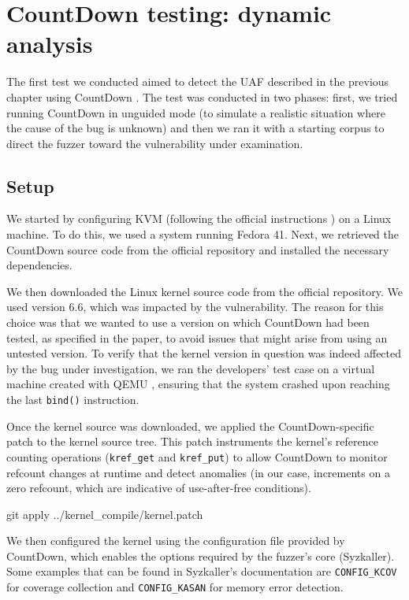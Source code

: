 \chapter{CountDown testing: dynamic analysis}

The first test we conducted aimed to detect the UAF described in the previous chapter using CountDown \cite{bib:countdown}. The test was conducted in two phases: first, we tried running CountDown in unguided mode (to simulate a realistic situation where the cause of the bug is unknown) and then we ran it with a starting corpus to direct the fuzzer toward the vulnerability under examination.

\section{Setup}
We started by configuring KVM (following the official instructions \cite{bib:kvm-install}) on a Linux machine. To do this, we used a system running Fedora 41. Next, we retrieved the CountDown source code from the official repository \cite{bib:countdown-repo} and installed the necessary dependencies. 

We then downloaded the Linux kernel source code from the official repository. We used version 6.6, which was impacted by the vulnerability. The reason for this choice was that we wanted to use a version on which CountDown had been tested, as specified in the paper, to avoid issues that might arise from using an untested version. To verify that the kernel version in question was indeed affected by the bug under investigation, we ran the developers' test case on a virtual machine created with QEMU \cite{bib:qemu}, ensuring that the system crashed upon reaching the last \texttt{bind()} instruction.

Once the kernel source was downloaded, we applied the CountDown-specific patch to the kernel source tree. This patch instruments the kernel's reference counting operations (\texttt{kref\_get} and \texttt{kref\_put}) to allow CountDown to monitor refcount changes at runtime and detect anomalies (in our case, increments on a zero refcount, which are indicative of use-after-free conditions).

\begin{bashlncode}
git apply ../kernel_compile/kernel.patch
\end{bashlncode}

\noindent We then configured the kernel using the configuration file provided by CountDown, which enables the options required by the fuzzer's core (Syzkaller). Some examples that can be found in Syzkaller's documentation \cite{bib:syzkaller-config} are \texttt{CONFIG\_KCOV} for coverage collection and \texttt{CONFIG\_KASAN} for memory error detection.

